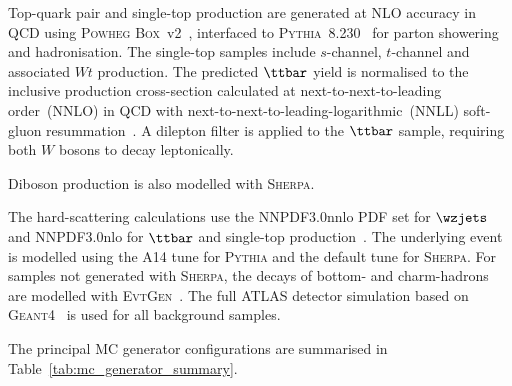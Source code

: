 Top-quark pair and single-top production are generated at NLO accuracy in QCD using \textsc{Powheg Box}~v2~\cite{Frixione2007PowhegHF,Nason2004Powheg,Frixione2007Powheg,Alioli2010PowhegBox}, interfaced to \textsc{Pythia}~8.230~\cite{Sjostrand2015Pythia82} for parton showering and hadronisation.
The single-top samples include $s$-channel, $t$-channel and associated $Wt$ production. 
The predicted $\ttbar$ yield is normalised to the inclusive production cross-section calculated at next-to-next-to-leading order~(NNLO) in QCD with next-to-next-to-leading-logarithmic~(NNLL) soft-gluon resummation~\cite{CzakonMitov2014TopPP}.
A dilepton filter is applied to the $\ttbar$ sample, requiring both $W$ bosons to decay leptonically.

Diboson production is also modelled with \textsc{Sherpa}.


The hard-scattering calculations use the NNPDF3.0nnlo PDF set for $\wzjets$ and NNPDF3.0nlo for $\ttbar$ and single-top production~\cite{Ball2015NNPDF30}.
The underlying event is modelled using the A14 tune for \textsc{Pythia} and the default tune for \textsc{Sherpa}.
For samples not generated with \textsc{Sherpa}, the decays of bottom- and charm-hadrons are modelled with \textsc{EvtGen}~\cite{Lange2001EvtGen}.
The full ATLAS detector simulation based on \textsc{Geant4}~\cite{ATLAS2010Simulation,Agostinelli2003Geant4} is used for all background samples.

The principal MC generator configurations are summarised in Table~\ref{tab:mc_generator_summary}.

